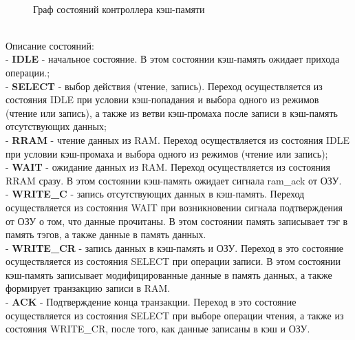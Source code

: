 \documentclass[13pt]{article}
\begin{document}
    \\
    \begin{figure}[h!]
		\caption{Граф состояний контроллера кэш-памяти}
	\end{figure}\\
    Описание состояний:\\
    - \textbf{IDLE} - начальное состояние. В этом состоянии кэш-память ожидает прихода операции.;\\
    - \textbf{SELECT} - выбор действия (чтение, запись). Переход осуществляется из состояния IDLE при условии кэш-попадания и выбора одного из режимов (чтение или запись), а также из ветви кэш-промаха после записи в кэш-память отсутствующих данных;\\
    - \textbf{RRAM} - чтение данных из RAM. Переход осуществляется из состояния IDLE при условии кэш-промаха и выбора одного из режимов (чтение или запись);\\
    - \textbf{WAIT} - ожидание данных из RAM. Переход осуществляется из состояния RRAM сразу. В этом состоянии кэш-память ожидает сигнала ram\_ack от ОЗУ.\\
    - \textbf{WRITE\_C} - запись отсутствующих данных в кэш-память. Переход осуществляется из состояния WAIT при возникновении сигнала подтверждения от ОЗУ о том, что данные прочитаны. В этом состоянии память записывает тэг в память тэгов, а также данные в память данных.\\
    - \textbf{WRITE\_CR} - запись данных в кэш-память и ОЗУ. Переход в это состояние осуществляется из состояния SELECT при операции записи. В этом состоянии кэш-память записывает модифицированные данные в память данных, а также формирует транзакцию записи в RAM.\\
    - \textbf{ACK} - Подтверждение конца транзакции. Переход в это состояние осуществляется из состояния SELECT при выборе операции чтения, а также из состояния WRITE\_CR, после того, как данные записаны в кэш и ОЗУ.
    
\end{document}

